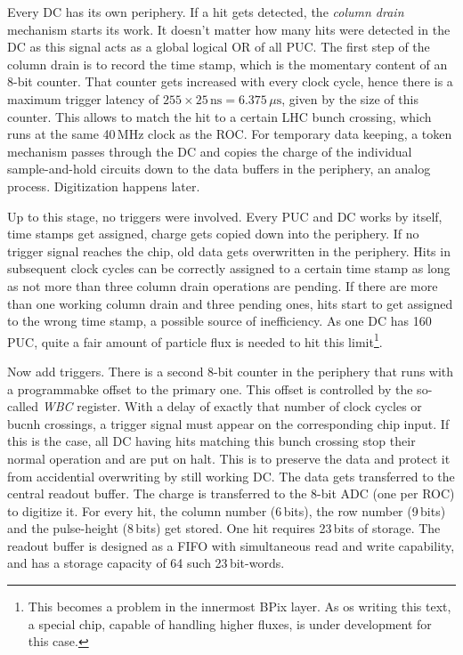 Every \gls{DC} has its own periphery. If a hit gets detected, the \emph{column drain} mechanism starts its work. It doesn't matter how many hits were detected in the \gls{DC} as this signal acts as a global logical OR of all \gls{PUC}. The first step of the column drain is to record the time stamp, which is the momentary content of an 8-bit counter. That counter gets increased with every clock cycle, hence there is a maximum trigger latency of $255\times25\,\text{ns}=6.375\,\mu\text{s}$, given by the size of this counter. This allows to match the hit to a certain LHC bunch crossing, which runs at the same 40\,MHz clock as the \gls{ROC}. For temporary data keeping, a token mechanism passes through the \gls{DC} and copies the charge of the individual sample-and-hold circuits down to the data buffers in the periphery, an analog process. Digitization happens later.

Up to this stage, no triggers were involved. Every \gls{PUC} and \gls{DC} works by itself, time stamps get assigned, charge gets copied down into the periphery. If no trigger signal reaches the chip, old data gets overwritten in the periphery. Hits in subsequent clock cycles can be correctly assigned to a certain time stamp as long as not more than three column drain operations are pending. If there are more than one working column drain and three pending ones, hits start to get assigned to the wrong time stamp, a possible source of inefficiency. As one \gls{DC} has 160\,\gls{PUC}, quite a fair amount of particle flux is needed to hit this limit\footnote{This becomes a problem in the innermost BPix layer. As os writing this text, a special chip, capable of handling higher fluxes, is under development for this case.}.

Now add triggers. There is a second 8-bit counter in the periphery that runs with a programmabke offset to the primary one. This offset is controlled by the so-called \emph{WBC} register. With a delay of exactly that number of clock cycles or bucnh crossings, a trigger signal must appear on the corresponding chip input. If this is the case, all \gls{DC} having hits matching this bunch crossing stop their normal operation and are put on halt. This is to preserve the data and protect it from accidential overwriting by still working \gls{DC}. The data gets transferred to the central readout buffer. The charge is transferred to the 8-bit ADC (one per \gls{ROC}) to digitize it. For every hit, the column number (6\,bits), the row number (9\,bits) and the pulse-height (8\,bits) get stored. One hit requires 23\,bits of storage. The readout buffer is designed as a FIFO with simultaneous read and write capability, and has a storage capacity of 64 such 23\,bit-words.

